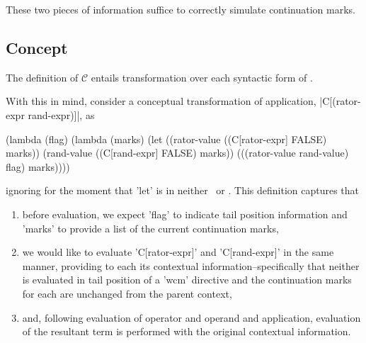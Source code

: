 
These two pieces of information suffice to correctly simulate continuation marks.

\subsection{Concept}

The definition of $\mathcal{C}$ entails transformation over each syntactic form of \cm.

With this in mind, consider a conceptual transformation of application, \scheme|C[(rator-expr rand-expr)]|, as
\begin{schemeblock}
\begin{schemedisplay}
(lambda (flag)
  (lambda (marks)
    (let ((rator-value ((C[rator-expr] FALSE) marks))
          (rand-value ((C[rand-expr] FALSE) marks))
      (((rator-value rand-value) flag) marks))))
\end{schemedisplay}
\end{schemeblock}
ignoring for the moment that \scheme'let' is in neither \lv\ or \cm. This definition captures that
\begin{enumerate}
\item before evaluation, we expect \scheme'flag' to indicate tail position information and \scheme'marks' to provide a list of the current continuation marks,
\item we would like to evaluate \scheme'C[rator-expr]' and \scheme'C[rand-expr]' in the same manner, providing to each its contextual information--specifically that neither is evaluated in tail position of a \scheme'wcm' directive and the continuation marks for each are unchanged from the parent context,
\item and, following evaluation of operator and operand and application, evaluation of the resultant term is performed with the original contextual information.
\end{enumerate}

